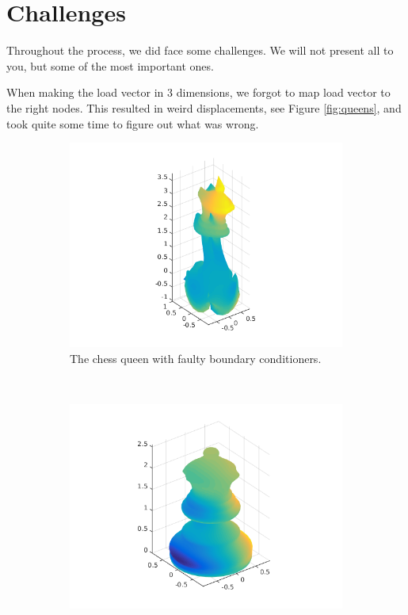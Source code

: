 \section{Challenges}

Throughout the process, we did face some challenges. We will not present all to you, but some of the most important ones. 

When making the load vector in 3 dimensions, we forgot to map load vector to the right nodes. This resulted in weird displacements, see Figure \ref{fig:queens}, and took quite some time to figure out what was wrong. 





\begin{figure}[ht]
        \centering
        \begin{subfigure}[b]{0.45 \textwidth}
                \includegraphics[width=\textwidth]{queen_broken}
                \caption{The chess queen with faulty boundary conditioners.}
        \end{subfigure}
        ~
        \begin{subfigure}[b]{0.45 \textwidth}
                \includegraphics[width=\textwidth]{queen_fixed}

\end{subfigure}
\end{figure}
